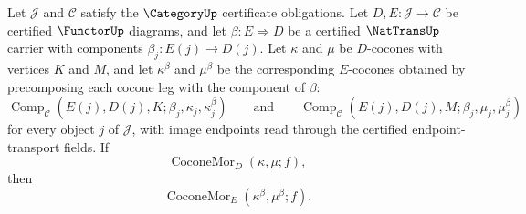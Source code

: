\begin{theorem}
\label{thm:catcolimit-cocone-morphism-nattrans-prewhiskering-descent}
Let $\mathcal J$ and $\mathcal C$ satisfy the $\CategoryUp$ certificate obligations. Let $D,E:\mathcal J\to\mathcal C$ be certified $\FunctorUp$ diagrams, and let $\beta:E\Rightarrow D$ be a certified $\NatTransUp$ carrier with components $\beta_j:E(j)\to D(j)$. Let $\kappa$ and $\mu$ be $D$-cocones with vertices $K$ and $M$, and let $\kappa^{\beta}$ and $\mu^{\beta}$ be the corresponding $E$-cocones obtained by precomposing each cocone leg with the component of $\beta$:
$$
\operatorname{Comp}_{\mathcal C}(E(j),D(j),K;\beta_j,\kappa_j,\kappa^{\beta}_j)
\qquad\text{and}\qquad
\operatorname{Comp}_{\mathcal C}(E(j),D(j),M;\beta_j,\mu_j,\mu^{\beta}_j)
$$
for every object $j$ of $\mathcal J$, with image endpoints read through the certified endpoint-transport fields. If
$$
\operatorname{CoconeMor}_{D}(\kappa,\mu;f),
$$
then
$$
\operatorname{CoconeMor}_{E}(\kappa^{\beta},\mu^{\beta};f).
$$
\end{theorem}
